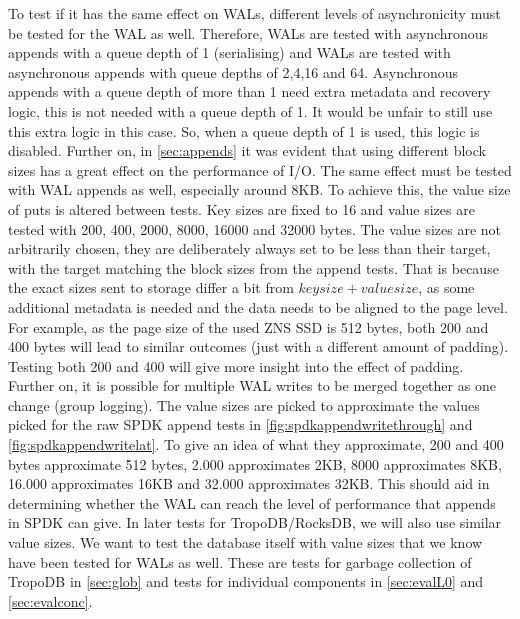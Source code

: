 To test if it has the same effect on WALs, different levels of asynchronicity must be tested for the WAL as well. Therefore, WALs are tested with asynchronous appends with a queue depth of 1 (serialising) and WALs are tested with asynchronous appends with queue depths of 2,4,16 and 64. Asynchronous appends with a queue depth of more than 1 need extra metadata and recovery logic, this is not needed with a queue depth of 1. It would be unfair to still use this extra logic in this case. So, when a queue depth of 1 is used, this logic is disabled. Further on, in \autoref{sec:appends} it was evident that using different block sizes has a great effect on the performance of I/O. The same effect must be tested with WAL appends as well, especially around 8KB. To achieve this, the value size of puts is altered between tests. Key sizes are fixed to 16 and value sizes are tested with 200, 400, 2000, 8000, 16000 and 32000 bytes. The value sizes are not arbitrarily chosen, they are deliberately always set to be less than their target, with the target matching the block sizes from the append tests. That is because the exact sizes sent to storage differ a bit from $keysize + valuesize$, as some additional metadata is needed and the data needs to be aligned to the page level. For example, as the page size of the used ZNS SSD is 512 bytes, both 200 and 400 bytes will lead to similar outcomes (just with a different amount of padding). Testing both 200 and 400 will give more insight into the effect of padding. Further on, it is possible for multiple WAL writes to be merged together as one change (group logging). The value sizes are picked to approximate the values picked for the raw SPDK append tests in \autoref{fig:spdkappendwritethrough} and \autoref{fig:spdkappendwritelat}. To give an idea of what they approximate, 200 and 400 bytes approximate 512 bytes, 2.000 approximates 2KB, 8000 approximates 8KB, 16.000 approximates 16KB and 32.000 approximates 32KB.  This should aid in determining whether the WAL can reach the level of performance that appends in SPDK can give. In later tests for TropoDB/RocksDB, we will also use similar value sizes. We want to test the database itself with value sizes that we know have been tested for WALs as well. These are tests for garbage collection of TropoDB in \autoref{sec:glob} and tests for individual components in \autoref{sec:evalL0} and \autoref{sec:evalconc}.

